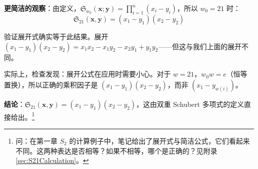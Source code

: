 \begin{Example}[$S_2$ 的计算]
\textbf{更简洁的观察}：由定义，$\mathfrak{S}_{w_0}(\mathbf{x}; \mathbf{y}) = \prod_{i=1}^n (x_i - y_i)$，所以 $w_0 = 21$ 时：
$$\mathfrak{S}_{21}(\mathbf{x},\mathbf{y}) = (x_1 - y_1)(x_2 - y_2)$$

验证展开式确实等于此结果。展开 $(x_1 - y_1)(x_2 - y_2) = x_1x_2 - x_1y_2 - x_2y_1 + y_1y_2$——但这与我们上面的展开不同。

实际上，检查发现：展开公式在应用时需要小心。对于 $w=21$，$w_0 w = e$（恒等置换），所以正确的乘积因子是 $(x_1-y_1)(x_2-y_2)$，而非 $(x_1-y_{w(i)})$。

\textbf{结论}：$\mathfrak{S}_{21}(\mathbf{x},\mathbf{y}) = (x_1 - y_1)(x_2 - y_2)$，这由双重 Schubert 多项式的定义直接给出。\footnote{问：在第一章 $S_2$ 的计算例子中，笔记给出了展开式与简洁公式，它们看起来不同。这两种表达是否相等？如果不相等，哪个是正确的？见附录 \cref{sec:S21Calculation}。}
\end{Example}

